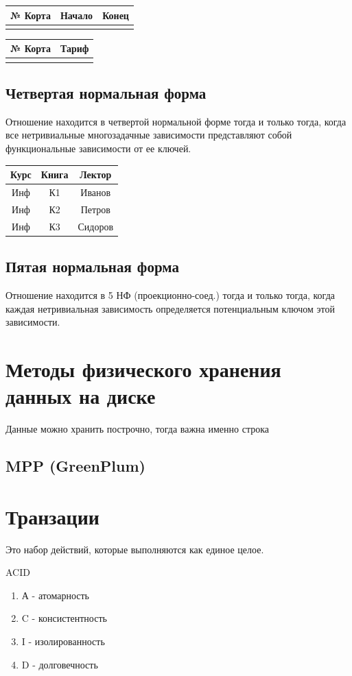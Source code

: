 \documentclass[a4paper, 14pt]{report}
\begin{document}
\begin{table}[H]
    \centering
    \begin{tabular}{|c|c|c|}
        \hline
        № Корта & Начало & Конец \\
        \hline
        & & \\
    \end{tabular}

    \begin{tabular}{|c|c|}
        \hline
        № Корта & Тариф \\
        \hline
                & \\
    \end{tabular}
\end{table}

\subsection{Четвертая нормальная форма}

Отношение находится в четвертой нормальной форме тогда и только тогда, когда все
нетривиальные многозадачные зависимости представляют собой функциональные зависимости
от ее ключей.

\begin{table}[H]
    \centering
    \begin{tabular}{|c|c|c|}
        \hline
        Курс & Книга & Лектор \\
        \hline
        Инф & К1 & Иванов \\
        Инф & К2 & Петров \\
        Инф & К3 & Сидоров \\
        \hline
    \end{tabular}
\end{table}

\subsection{Пятая нормальная форма}

Отношение находится в 5 НФ (проекционно-соед.) тогда и только тогда,
когда каждая нетривиальная зависимость определяется потенциальным
ключом этой зависимости.

\section{Методы физического хранения данных на диске}

Данные можно хранить построчно, тогда важна именно строка

\subsection{MPP (GreenPlum)}

\section{Транзации}

Это набор действий, которые выполняются как единое целое.

ACID

\begin{enumerate}
    \item А - атомарность
    \item C - консистентность
    \item I - изолированность
    \item D - долговечность
\end{enumerate}
\end{document}
